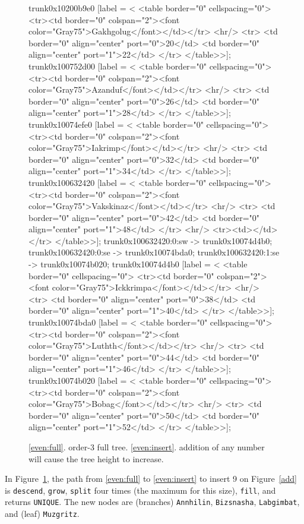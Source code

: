 \documentclass[12pt]{article}
\newcommand{\code}[1]{\colorbox{light-gray}{\texttt{#1}}}
\begin{document}
\begin{figure}
{{	trunk0x10200b9e0 [label = <
<table border="0" cellspacing="0">
	<tr><td border="0" colspan="2"><font color="Gray75">Gakhgolug</font></td></tr>
	<hr/>
	<tr>
	<td border="0" align="center" port="0">20</td>
	<td border="0" align="center" port="1">22</td>
	</tr>
</table>>];
	trunk0x100752d00 [label = <
<table border="0" cellspacing="0">
	<tr><td border="0" colspan="2"><font color="Gray75">Azanduf</font></td></tr>
	<hr/>
	<tr>
	<td border="0" align="center" port="0">26</td>
	<td border="0" align="center" port="1">28</td>
	</tr>
</table>>];
	trunk0x10074efe0 [label = <
<table border="0" cellspacing="0">
	<tr><td border="0" colspan="2"><font color="Gray75">Iakrimp</font></td></tr>
	<hr/>
	<tr>
	<td border="0" align="center" port="0">32</td>
	<td border="0" align="center" port="1">34</td>
	</tr>
</table>>];
	trunk0x100632420 [label = <
<table border="0" cellspacing="0">
	<tr><td border="0" colspan="2"><font color="Gray75">Vakskinaz</font></td></tr>
	<hr/>
	<tr>
	<td border="0" align="center" port="0">42</td>
	<td border="0" align="center" port="1">48</td>
	</tr>
	<hr/>
	<tr><td></td></tr>
</table>>];
	trunk0x100632420:0:sw -> trunk0x10074d4b0;
	trunk0x100632420:0:se -> trunk0x10074bda0;
	trunk0x100632420:1:se -> trunk0x10074b020;
	trunk0x10074d4b0 [label = <
<table border="0" cellspacing="0">
	<tr><td border="0" colspan="2"><font color="Gray75">Ickkrimpa</font></td></tr>
	<hr/>
	<tr>
	<td border="0" align="center" port="0">38</td>
	<td border="0" align="center" port="1">40</td>
	</tr>
</table>>];
	trunk0x10074bda0 [label = <
<table border="0" cellspacing="0">
	<tr><td border="0" colspan="2"><font color="Gray75">Luthth</font></td></tr>
	<hr/>
	<tr>
	<td border="0" align="center" port="0">44</td>
	<td border="0" align="center" port="1">46</td>
	</tr>
</table>>];
	trunk0x10074b020 [label = <
<table border="0" cellspacing="0">
	<tr><td border="0" colspan="2"><font color="Gray75">Bobag</font></td></tr>
	<hr/>
	<tr>
	<td border="0" align="center" port="0">50</td>
	<td border="0" align="center" port="1">52</td>
	</tr>
</table>>];
		}
	}
    \caption{\ref{even:full}. order-3 full tree. \ref{even:insert}. addition of any number will cause the tree height to increase.}%
	\label{even}%
\end{figure}%

In Figure~\ref{even}, the path from \ref{even:full} to \ref{even:insert} to insert 9 on Figure~\ref{add} is \code{descend}, \code{grow}, \code{split} four times (the maximum for this size), \code{fill}, and returns \code{UNIQUE}. The new nodes are (branches) \code{Annhilin}, \code{Bizsnasha}, \code{Labgimbat}, and (leaf) \code{Muzgritz}.
\end{document}
